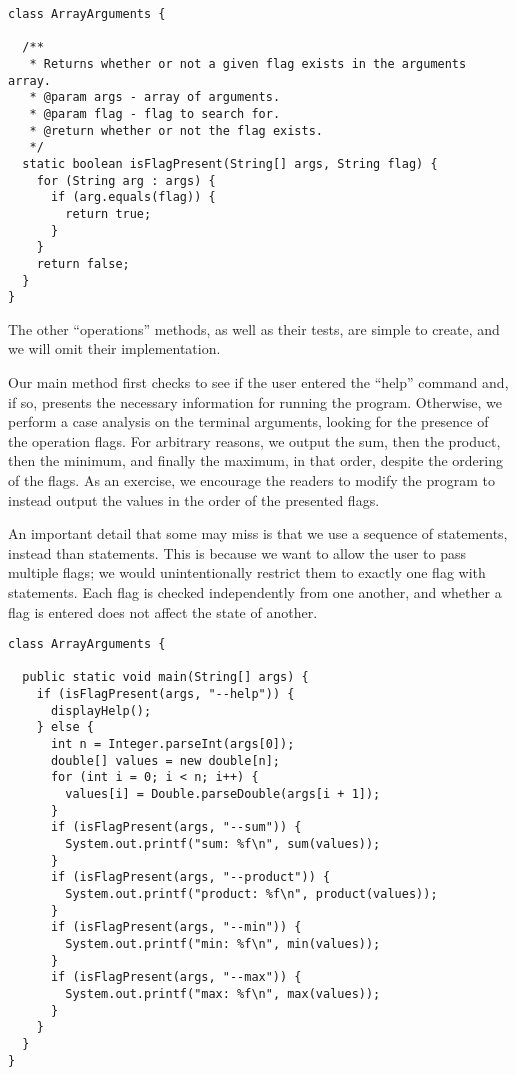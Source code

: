\begin{lstlisting}[language=MyJava]
class ArrayArguments {

  /**
   * Returns whether or not a given flag exists in the arguments array.
   * @param args - array of arguments.
   * @param flag - flag to search for.
   * @return whether or not the flag exists.
   */
  static boolean isFlagPresent(String[] args, String flag) {
    for (String arg : args) {
      if (arg.equals(flag)) { 
        return true; 
      }
    }
    return false;
  }
}
\end{lstlisting}

The other ``operations'' methods, as well as their tests, are simple to create, and we will omit their implementation. 

Our main method first checks to see if the user entered the ``help'' command and, if so, presents the necessary information for running the program. 
Otherwise, we perform a case analysis on the terminal arguments, looking for the presence of the operation flags. 
For arbitrary reasons, we output the sum, then the product, then the minimum, and finally the maximum, in that order, despite the ordering of the flags. 
As an exercise, we encourage the readers to modify the program to instead output the values in the order of the presented flags. 

An important detail that some may miss is that we use a sequence of  statements, instead than  statements. 
This is because we want to allow the user to pass multiple flags; we would unintentionally restrict them to exactly one flag with  statements. 
Each flag is checked independently from one another, and whether a flag is entered does not affect the state of another.

\enlargethispage{-6\baselineskip}
\begin{lstlisting}[language=MyJava]
class ArrayArguments {

  public static void main(String[] args) {
    if (isFlagPresent(args, "--help")) {
      displayHelp();
    } else {
      int n = Integer.parseInt(args[0]);
      double[] values = new double[n];
      for (int i = 0; i < n; i++) { 
        values[i] = Double.parseDouble(args[i + 1]); 
      }
      if (isFlagPresent(args, "--sum")) { 
        System.out.printf("sum: %f\n", sum(values)); 
      }
      if (isFlagPresent(args, "--product")) { 
        System.out.printf("product: %f\n", product(values)); 
      }
      if (isFlagPresent(args, "--min")) { 
        System.out.printf("min: %f\n", min(values)); 
      }
      if (isFlagPresent(args, "--max")) { 
        System.out.printf("max: %f\n", max(values)); 
      }
    }
  }
}
\end{lstlisting}

